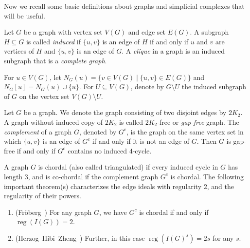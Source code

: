 \documentclass[ALCO,published]{cedram}
\numberwithin{equation}{section}
\newcommand \reg{\operatorname{reg}}
\begin{document}
Now we recall some basic definitions about graphs and simplicial complexes that will be useful.

Let $G$ be a graph with vertex set $V(G)$
and edge set $E(G)$.  
A subgraph $H \subseteq G$  is called \textit{induced} if $\{u,v\}$ is an edge of $H$ if and only if $u$ and $v$ are vertices of $H$ and $\{u,v\}$ is an edge of $G$. 
A \textit{clique} in a graph is an induced subgraph that is a  \emph{complete graph}.

For $u\in V(G)$, let $N_G(u) = \{v \in V (G)\mid \{u, v\} \in E(G)\}$ and $N_G[u]=N_G(u)\cup \{u\}$.
For $U \subseteq V(G)$, denote by $G \setminus U$
the induced subgraph of $G$ on the vertex set $V(G) \setminus U$.

Let $G$ be a graph. We denote the graph consisting of two disjoint edges
 by $2K_2$.
A graph without induced copy of $2K_2$ is called $2K_2$-free or \textit{gap-free} graph. The \textit{complement} of a graph $G$, denoted by $G^c$, is the graph on the same
vertex set in which $\{u,v\}$ is an edge of $G^c$ if and only if it is not an edge of $G$.
Then  $G$ is gap-free if and only if $G^c$ contains no induced $4$-cycle.

A graph $G$ is chordal (also called triangulated) if every induced
cycle in $G$ has length $3$, and is co-chordal if the complement graph $G^c$ is chordal.
 The following important theorem(s) characterizes the edge ideals with regularity 2, and the regularity of their powers.

 

\begin{theorem}
\begin{enumerate}
\item \textup{(}Fr\"oberg~\cite[Thm.1]{froberg}\textup{)} For any graph $G$, we have $G^c$ is chordal if and only if $\reg(I(G))=2$. 

\item \textup{(}Herzog--Hibi--Zheng~\cite[Thm.1.2]{HHZ}\textup{)} Further, in this case $\reg(I(G)^s)=2s$ for any $s$.
\end{enumerate}
\label{thm:chordal}
\end{theorem}
\end{document}

